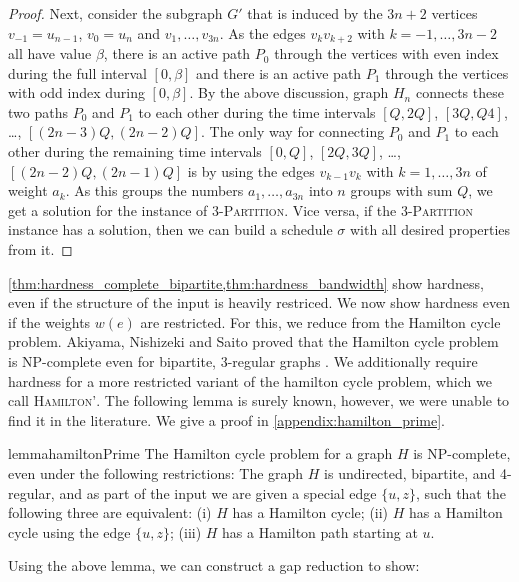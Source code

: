 \documentclass[runningheads]{llncs}
\numberwithin{equation}{section}
\newcommand{\set}[1]{\{ #1 \}}
\begin{document}
\begin{proof}
Next, consider the subgraph $G'$ that is induced by the $3n+2$ vertices $v_{-1}=u_{n-1}$, $v_0=u_n$ and 
$v_1,\ldots,v_{3n}$.
As the edges $v_kv_{k+2}$ with $k=-1,\ldots,3n-2$ all have value $\beta$, there is an active path $P_0$ 
through the vertices with even index during the full interval $[0,\beta]$ and there is an active 
path $P_1$ through the vertices with odd index during $[0, \beta]$.
By the above discussion, graph $H_n$ connects these two paths $P_0$ and $P_1$ to each other during the
time intervals $[Q,2Q]$, $[3Q,Q4]$, \dots, $[(2n-3)Q,(2n-2)Q]$.
The only way for connecting $P_0$ and $P_1$ to each other during the remaining time intervals 
$[0,Q]$, $[2Q,3Q]$, \dots, $[(2n-2)Q,(2n-1)Q]$ is by using the edges $v_{k-1}v_k$ with $k=1,\ldots,3n$ of 
weight $a_k$.
As this groups the numbers $a_1,\ldots,a_{3n}$ into $n$ groups with sum $Q$, we get a solution
for the instance of \textsc{3-Partition}.
Vice versa, if the \textsc{3-Partition} instance has a solution, then we can build a schedule $\sigma$
with all desired properties from it.
\end{proof}

\cref{thm:hardness_complete_bipartite,thm:hardness_bandwidth} show hardness, even if the structure of the input is heavily restriced. We now show hardness even if the weights $w(e)$ are restricted. For this, we reduce from the Hamilton cycle problem. Akiyama, Nishizeki and Saito proved that the Hamilton cycle problem is NP-complete even for bipartite, 3-regular graphs \cite{hamilton3regularBip}. We additionally require hardness for a more restricted variant of the hamilton cycle problem, which we call \textsc{Hamilton'}. The following lemma is surely known, however, we were unable to find it in the literature. We give a proof in \cref{appendix:hamilton_prime}.

\begin{restatable}{lemma}{hamiltonPrime}
\label{hamilton_cycle_lemma}
The Hamilton cycle problem for a graph $H$ is NP-complete, even under the following restrictions: The graph $H$ is undirected, bipartite, and 4-regular, and as part of the input we are given a special edge $\set{u, z}$, such that the following three are equivalent: (i) $H$ has a Hamilton cycle; (ii) $H$ has a Hamilton cycle using the edge $\set{u, z}$; (iii) $H$ has a Hamilton path starting at $u$.
\end{restatable} 

Using the above lemma, we can construct a gap reduction to show:
\end{document}
